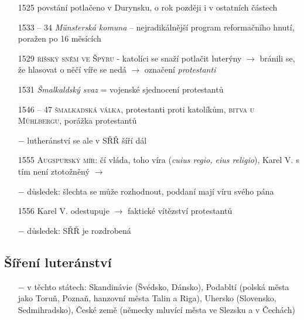 \documentclass{article}
\begin{document}
\begin{itemize}
    \item[1525] povstání potlačeno v Durynsku, o rok později i v ostatních částech
    \item[1533 -- 34] \textit{Münsterská komuna} -- nejradikálnější program reformačního hnutí, poražen po 16 měsících
    \item[1529] \textsc{říšský sněm ve Špýru} - katolíci se snaží potlačit luterýny $\rightarrow$ bránili se, že hlasovat o něčí víře se nedá $\rightarrow$ označení \textit{protestanti}
    \item[1531] \textit{Šmalkaldský svaz} = vojenské sjednocení protestantů
    \item[1546 -- 47] \textsc{šmalkadská válka}, protestanti proti katolíkům, \textsc{bitva u Mühlbergu}, porážka protestantů
    \item[$-$] lutheránství se ale v SŘŘ šíří dál
    \item[1555] \textsc{Augspurský mír}: čí vláda, toho víra (\textit{cuius regio, eius religio}), Karel V. s tím není ztotožněný $\rightarrow$
    \item[$-$] důsledek: šlechta se může rozhodnout, poddaní mají víru svého pána
    \item[1556] Karel V. odestupuje $\rightarrow$ faktické vítězství protestantů
    \item[$-$] důsledek: SŘŘ je rozdrobená

\end{itemize}

\subsection*{Šíření luteránství}
\begin{itemize}
    \vspace{-0.5em}
    \setlength\itemsep{0.15em}
    \item[$-$] v těchto státech: Skandinávie (Švédsko, Dánsko), Podabltí (polská města jako Toruň, Poznaň, hanzovní města Talin a Riga), Uhersko (Slovensko, Sedmihradsko), České země (německy mluvící města ve Slezsku a v Čechách)
\end{itemize}
\end{document}
